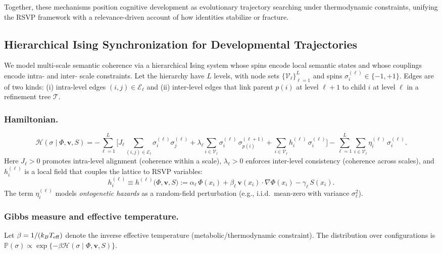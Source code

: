 \documentclass[a4paper,11pt]{article}
\begin{document}
Together, these mechanisms position cognitive development as evolutionary
trajectory searching under thermodynamic constraints, unifying the RSVP
framework with a relevance-driven account of how identities stabilize or
fracture.

\subsection{Hierarchical Ising Synchronization for Developmental Trajectories}
\label{sec:hierarchical-ising}

We model multi-scale semantic coherence via a hierarchical Ising system whose
spins encode local semantic states and whose couplings encode intra- and inter-
scale constraints. Let the hierarchy have $L$ levels, with node sets
$\{\mathcal{V}_\ell\}_{\ell=1}^{L}$ and spins $\sigma_i^{(\ell)}\in\{-1,+1\}$.
Edges are of two kinds: (i) intra-level edges $(i,j)\in\mathcal{E}_\ell$ and
(ii) inter-level edges that link parent $p(i)$ at level $\ell{+}1$ to child
$i$ at level $\ell$ in a refinement tree $\mathcal{T}$.

\subsubsection{Hamiltonian.}
\begin{equation}
\label{eq:hier-ising-hamiltonian}
\mathcal{H}(\sigma \mid \Phi,\mathbf v,S)
=
-\sum_{\ell=1}^{L}\Bigg[
  J_\ell \!\!\!\sum_{(i,j)\in\mathcal{E}_\ell}\!\! \sigma_i^{(\ell)}\sigma_j^{(\ell)}
 +\lambda_\ell \!\!\sum_{i\in\mathcal{V}_\ell}\!\! \sigma_i^{(\ell)}\,\sigma_{p(i)}^{(\ell+1)}
 +\sum_{i\in\mathcal{V}_\ell}\! h_i^{(\ell)}\,\sigma_i^{(\ell)}
\Bigg]
-\sum_{\ell=1}^{L}\sum_{i\in\mathcal{V}_\ell}\eta_i^{(\ell)}\,\sigma_i^{(\ell)}.
\end{equation}
Here $J_\ell>0$ promotes intra-level alignment (coherence within a scale),
$\lambda_\ell>0$ enforces inter-level consistency (coherence across scales), and
$h_i^{(\ell)}$ is a local field that couples the lattice to RSVP variables:
\begin{equation}
h_i^{(\ell)}\equiv h^{(\ell)}\!\big(\Phi,\mathbf v,S\big)
:= \alpha_\ell\,\Phi(x_i)
   + \beta_\ell\,\mathbf v(x_i)\!\cdot\!\nabla\Phi(x_i)
   - \gamma_\ell\,S(x_i).
\end{equation}
The term $\eta_i^{(\ell)}$ models \emph{ontogenetic hazards} as a random-field
perturbation (e.g., i.i.d.\ mean-zero with variance $\sigma_\ell^2$).

\subsubsection{Gibbs measure and effective temperature.}
Let $\beta=1/(k_B T_{\rm eff})$ denote the inverse effective temperature
(metabolic/thermodynamic constraint). The distribution over configurations is
\(
\mathbb{P}(\sigma)\propto \exp\{-\beta \mathcal{H}(\sigma \mid \Phi,\mathbf v,S)\}.
\)
\end{document}
